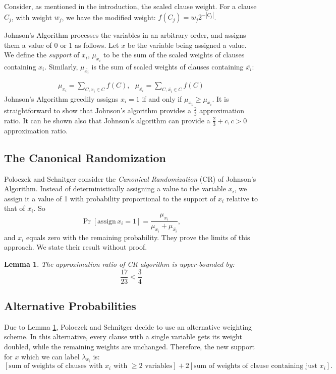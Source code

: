 \documentclass[11pt,letter]{article}
\newtheorem{lemma}[theorem]{Lemma}
\numberwithin{theorem}{section}
\begin{document}
Consider, as mentioned in the introduction, the scaled clause weight.
For a clause $C_j$, with weight $w_j$, we have the modified weight:  $f(C_j) = w_j 2^{-|C_j|}$.

Johnson's Algorithm processes the variables in an arbitrary order, and assigns them a value of 0 or 1 as follows. Let $x$ be the variable being assigned a value. We define the \emph{support} of $x_i$, $\mu_{x_i}$ to be the sum of the scaled weights of clauses containing $x_i$. Similarly, $\mu_{\bar{x_i}}$ is the sum of scaled weights of clauses containing $\bar{x_i}$:

\begin{align*}
\mu_{x_i} = \sum_{C,x_i \in C}f(C), \,\,\,\, \mu_{\bar{x_i}} =\sum_{C,\bar{x_i}\in C}f(C)
\end{align*}
Johnson's Algorithm greedily assigns $x_i =1$ if and only if $\mu_{x_1} \ge \mu_{\bar{x_i}}$. It is straightforward to show that Johnson's algorithm provides a $\frac{2}{3}$ approximation ratio. It can be shown also that Johnson's algorithm can provide a $\frac{2}{3} + c, c>0$ approximation ratio.

\subsection*{The Canonical Randomization}
Poloczek and Schnitger consider the \emph{Canonical Randomization} (CR) of Johnson's Algorithm. Instead of deterministically assigning a value to the variable $x_i$, we assign it a value of 1 with probability proportional to the support of $x_i$ relative to that of $\bar{x_i}$. So
\[\Pr[\mathrm{assign }\, x_i=1] = \frac{\mu_{x_i}}{\mu_{x_i} + \mu_{\bar{x_i}}},\] and $x_i$ equals zero with the remaining probability. They prove the limits of this approach. We state their result without proof.

\begin{lemma}
\label{L:1}
The approximation ratio of CR algorithm is upper-bounded by:
$$\frac{17}{23} < \frac{3}{4}$$

\end{lemma}

\subsection*{Alternative Probabilities}
Due to Lemma \ref{L:1}, Poloczek and Schnitger decide to use an alternative weighting scheme. In this alternative, every clause with a single variable gets its weight doubled, while the remaining weights are unchanged. Therefore, the new support for $x$ which we can label $\lambda_{x_i}$ is:
\[[\textrm{sum of weights of clauses with }x_i\textrm{ with }\ge 2\textrm{ variables}] + 2[\textrm{sum of weights of clause containing just }x_i].\]
\end{document}
